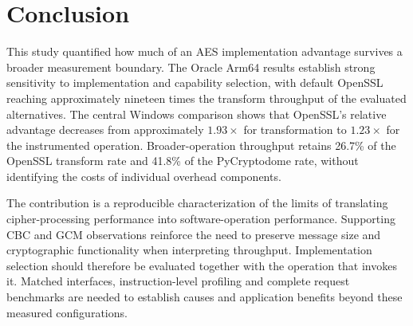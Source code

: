 \section{Conclusion}
\label{sec:conclusion}
This study quantified how much of an AES implementation advantage survives a broader measurement boundary. The Oracle Arm64 results establish strong sensitivity to implementation and capability selection, with default OpenSSL reaching approximately nineteen times the transform throughput of the evaluated alternatives. The central Windows comparison shows that OpenSSL's relative advantage decreases from approximately $1.93\times$ for transformation to $1.23\times$ for the instrumented operation. Broader-operation throughput retains 26.7\% of the OpenSSL transform rate and 41.8\% of the PyCryptodome rate, without identifying the costs of individual overhead components.

The contribution is a reproducible characterization of the limits of translating cipher-processing performance into software-operation performance. Supporting CBC and GCM observations reinforce the need to preserve message size and cryptographic functionality when interpreting throughput. Implementation selection should therefore be evaluated together with the operation that invokes it. Matched interfaces, instruction-level profiling and complete request benchmarks are needed to establish causes and application benefits beyond these measured configurations.
